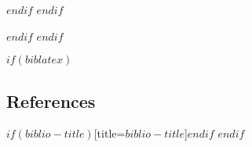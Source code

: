 \documentclass[final]{beamer}
\begin{document}
\begin{frame}[t]
\begin{multicols}{2}
\renewcommand\refname{$biblio-title$}
$endif$
$endif$


$endif$
$endif$

$if(biblatex)$
\subsection{References}

\printbibliography$if(biblio-title)$[title=$biblio-title$]$endif$
$endif$


\end{multicols}

\end{frame}
\end{document}
